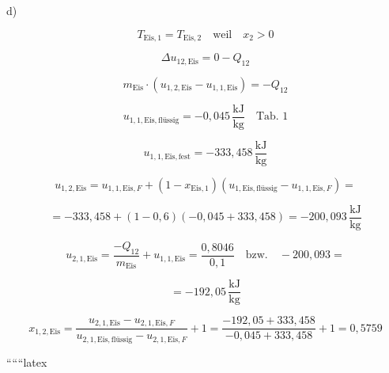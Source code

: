 d)
\]

\[
T_{\text{Eis},1} = T_{\text{Eis},2} \quad \text{weil} \quad x_2 > 0
\]

\[
\Delta u_{12,\text{Eis}} = 0 - Q_{12}
\]

\[
m_{\text{Eis}} \cdot (u_{1,2,\text{Eis}} - u_{1,1,\text{Eis}}) = -Q_{12}
\]

\[
u_{1,1,\text{Eis},\text{flüssig}} = -0,045 \, \frac{\text{kJ}}{\text{kg}} \quad \text{Tab. 1}
\]

\[
u_{1,1,\text{Eis},\text{fest}} = -333,458 \, \frac{\text{kJ}}{\text{kg}}
\]

\[
u_{1,2,\text{Eis}} = u_{1,1,\text{Eis},F} + (1 - x_{\text{Eis},1}) \left( u_{1,\text{Eis},\text{flüssig}} - u_{1,1,\text{Eis},F} \right) =
\]

\[
= -333,458 + (1 - 0,6) \left( -0,045 + 333,458 \right) = -200,093 \, \frac{\text{kJ}}{\text{kg}}
\]

\[
u_{2,1,\text{Eis}} = \frac{-Q_{12}}{m_{\text{Eis}}} + u_{1,1,\text{Eis}} = \frac{0,8046}{0,1} \quad \text{bzw.} \quad -200,093 =
\]

\[
= -192,05 \, \frac{\text{kJ}}{\text{kg}}
\]

\[
x_{1,2,\text{Eis}} = \frac{u_{2,1,\text{Eis}} - u_{2,1,\text{Eis},F}}{u_{2,1,\text{Eis},\text{flüssig}} - u_{2,1,\text{Eis},F}} + 1 = \frac{-192,05 + 333,458}{-0,045 + 333,458} + 1 = 0,5759
\]

``````latex